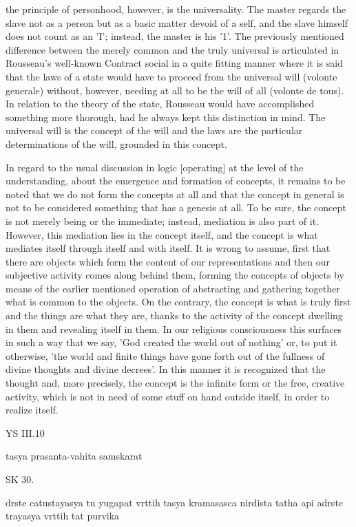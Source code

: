 the principle of personhood, however, is the universality.
The master regards the slave not as a person but as a basic matter
devoid of a self, and the slave himself does not count as an 'I'; instead,
the master is his '1'.
The previously mentioned difference between the merely
common and the truly universal is articulated in Rousseau's well-known Contract
social in a quite fitting manner where it is said that the laws of a state would have
to proceed from the universal will (volonte generale) without, however, needing
at all to be the will of all (volonte de tous).
In relation to the theory of the state,
Rousseau would have accomplished something more thorough, had he always
kept this distinction in mind.
The universal will is the concept of the will and the
laws are the particular determinations of the will, grounded in this
concept.

In regard to the usual discussion in logic [operating] at
the level of the understanding, about the emergence and formation of concepts,
it remains to be noted that we do not form the concepts at all and
that the concept in general is not to be considered something that has a genesis at all.
To be sure, the concept is not merely being or the immediate;
instead, mediation is also part of it.
However, this mediation lies in the concept itself,
and the concept is what mediates itself through itself and with itself.
It is wrong to assume, first that there are objects
which form the content of our representations and
then our subjective activity comes along behind them,
forming the concepts of objects by means of the earlier mentioned operation of
abstracting and gathering together what is common to the objects.
On the contrary, the concept is what is truly first and
the things are what they are, thanks to the activity of
the concept dwelling in them and revealing itself in them.
In our religious consciousness this surfaces in such a way that we say,
'God created the world out of nothing' or, to put it otherwise,
'the world and finite things have gone forth out of
the fullness of divine thoughts and divine decrees'.
In this manner it is recognized that the thought and, more precisely,
the concept is the infinite form or the free, creative activity,
which is not in need of some stuff on hand outside itself,
in order to realize itself.

YS III.10

tasya prasanta-vahita samskarat

SK 30.

drste catustayasya tu yugapat vrttih tasya kramasasca nirdista
tatha api adrste trayasya vrttih tat purvika

